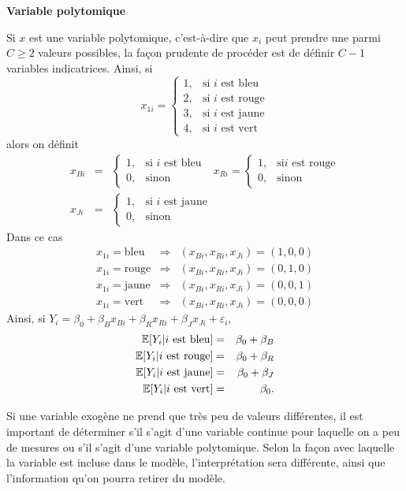 \textbf{Variable polytomique}

Si $x$ est une variable polytomique, c'est-à-dire que $x_i$ peut
prendre une parmi $C\ge2$ valeurs possibles, la fa\c{c}on prudente
de procéder est de définir $C-1$ variables indicatrices.
Ainsi,
si $$x_{1i}=\left\{\begin{array}{ll} 1, & \mbox{si $i$ est bleu}\\
2, & \mbox{si $i$ est rouge}\\ 3, & \mbox{si $i$ est jaune}\\ 4, &
\mbox{si $i$ est vert}\end{array}\right.$$ alors on définit
\begin{eqnarray*}
x_{Bi}&=&\left\{\begin{array}{ll}1, & \mbox{si $i$ est bleu}\\ 0,
& \mbox{sinon}\end{array}\right.\ \ \
x_{Ri}=\left\{\begin{array}{ll}1, & \mbox{si
$i$ est rouge}\\ 0, & \mbox{sinon}\end{array}\right.\\
x_{Ji}&=&\left\{\begin{array}{ll}1, & \mbox{si $i$ est jaune}\\
0, & \mbox{sinon}\end{array}\right.\end{eqnarray*} Dans ce cas
\begin{eqnarray*}
x_{1i}=\mbox{bleu}&\Rightarrow&(x_{Bi},x_{Ri},x_{Ji})=(1,0,0)\\
x_{1i}=\mbox{rouge}&\Rightarrow&(x_{Bi},x_{Ri},x_{Ji})=(0,1,0)\\
x_{1i}=\mbox{jaune}&\Rightarrow&(x_{Bi},x_{Ri},x_{Ji})=(0,0,1)\\
x_{1i}=\mbox{vert}&\Rightarrow&(x_{Bi},x_{Ri},x_{Ji})=(0,0,0)
\end{eqnarray*}
Ainsi, si
$Y_i=\beta_0+\beta_{B}x_{Bi}+\beta_Rx_{Ri}+\beta_Jx_{Ji}+\varepsilon_i$,
\begin{eqnarray*}
\mathbb{E}[Y_i|\mbox{$i$ est bleu}]&=&\beta_0+\beta_B\\
\mathbb{E}[Y_i|\mbox{$i$ est rouge}]&=&\beta_0+\beta_R\\
\mathbb{E}[Y_i|\mbox{$i$ est jaune}]&=&\beta_0+\beta_J\\
\mathbb{E}[Y_i|\mbox{$i$ est vert}]&=&\beta_0.
\end{eqnarray*}


\begin{remarque}
Si une variable exogène ne prend que très peu de valeurs différentes, il est important de déterminer s'il s'agit d'une variable continue pour laquelle on a peu de mesures ou s'il
s'agit d'une variable polytomique. Selon la façon avec laquelle la variable est incluse dans le modèle, l'interprétation sera différente, ainsi que l'information qu'on pourra retirer du modèle.
\end{remarque}

